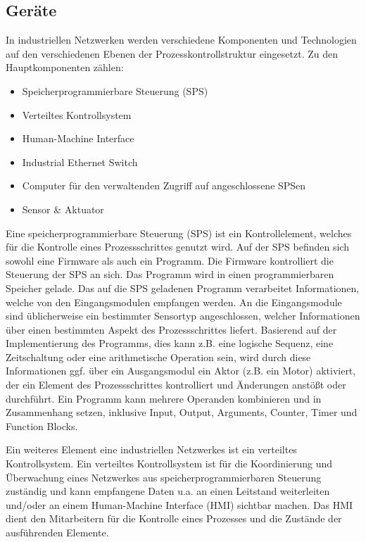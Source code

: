 \subsection{Geräte}
In industriellen Netzwerken werden verschiedene Komponenten und Technologien auf den verschiedenen Ebenen der Prozesskontrollstruktur eingesetzt. Zu den Hauptkomponenten zählen:
\begin{itemize}
\item Speicherprogrammierbare Steuerung (SPS)
\item Verteiltes Kontrollsystem
\item Human-Machine Interface
\item Industrial Ethernet Switch
\item Computer für den verwaltenden Zugriff auf angeschlossene SPSen
\item Sensor \& Aktuator
\end{itemize}


Eine speicherprogrammierbare Steuerung (SPS) ist ein Kontrollelement, welches für die Kontrolle eines Prozessschrittes genutzt wird.
Auf der SPS befinden sich sowohl eine Firmware als auch ein Programm. Die Firmware kontrolliert die Steuerung der SPS an sich. Das Programm wird in einen programmierbaren Speicher gelade. Das auf die SPS geladenen Programm verarbeitet Informationen, welche von den Eingangsmodulen empfangen werden. An die Eingangsmodule sind üblicherweise ein bestimmter Sensortyp angeschlossen, welcher Informationen über einen bestimmten Aspekt des Prozessschrittes liefert. Basierend auf der Implementierung des Programms, dies kann z.B. eine logische Sequenz, eine Zeitschaltung oder eine arithmetische Operation sein, wird durch diese Informationen ggf. über ein Ausgangsmodul ein Aktor (z.B. ein Motor) aktiviert, der ein Element des Prozessschrittes kontrolliert und Änderungen anstößt oder durchführt. Ein Programm kann mehrere Operanden kombinieren und in Zusammenhang setzen, inklusive Input, Output, Arguments, Counter, Timer und Function Blocks.

Ein weiteres Element eine industriellen Netzwerkes ist ein verteiltes Kontrollsystem. Ein verteiltes Kontrollsystem ist für die Koordinierung und Überwachung eines Netzwerkes aus speicherprogrammierbaren Steuerung zuständig und kann empfangene Daten u.a. an einen Leitstand weiterleiten und/oder an einem Human-Machine Interface (HMI) sichtbar machen. Das HMI dient den Mitarbeitern für die Kontrolle eines Prozesses und die Zustände der ausführenden Elemente.


